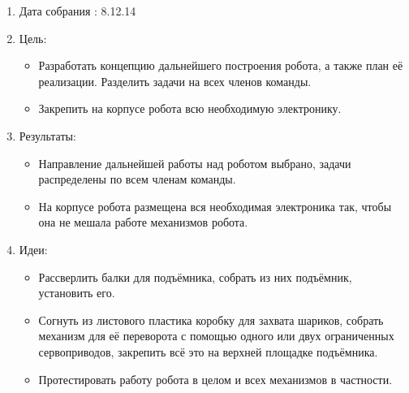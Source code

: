 
  \begin{enumerate}
    \item Дата собрания : 8.12.14
  	\item Цель:
  	\begin{itemize}
  	  \item Разработать концепцию дальнейшего построения робота, а также план её реализации. Разделить задачи на всех членов команды.
  	  \item Закрепить на корпусе робота всю необходимую электронику.
  	\end{itemize}
  	\item Результаты:
  	\begin{itemize}
  	  \item Направление дальнейшей работы над роботом выбрано, задачи распределены по всем членам команды.
  	  \item На корпусе робота размещена вся необходимая электроника так, чтобы она не мешала работе механизмов робота.
   	\end{itemize} 
   	\item Идеи:
   	\begin{itemize}
   		\item Рассверлить балки для подъёмника, собрать из них подъёмник, установить его.
   		\item Согнуть из листового пластика коробку для захвата шариков, собрать механизм для её переворота с помощью одного или двух ограниченных сервоприводов, закрепить всё это на верхней площадке подъёмника.
   		\item Протестировать работу робота в целом и всех механизмов в частности.
   	\end{itemize}
   \end{enumerate}
\fillpage